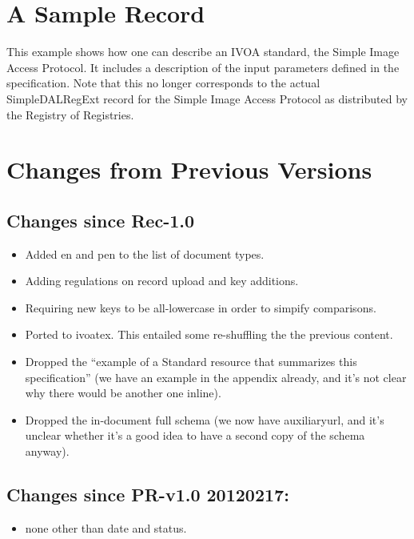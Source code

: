 \documentclass[11pt,a4paper]{ivoa}
\begin{document}
\appendix

\section{A Sample Record}
\label{app:fullrecord}

This example shows how one can describe an IVOA standard, the Simple
Image Access Protocol.  It includes a description of the input parameters
defined in the specification.  Note that this no longer corresponds to
the actual SimpleDALRegExt record for the Simple Image Access Protocol
as distributed by the Registry of Registries.



\section{Changes from Previous Versions}

\subsection{Changes since Rec-1.0}

\begin{itemize}
\item Added en and pen to the list of document types.
\item Adding regulations on record upload and key additions.
\item Requiring new keys to be all-lowercase in order to simpify
comparisons.
\item Ported to ivoatex.  This entailed some re-shuffling the the
previous content.
\item Dropped the ``example of a Standard resource that summarizes this
specification'' (we have an example in the appendix already, and it's
not clear why there would be another one inline).
\item Dropped the in-document full schema (we now have auxiliaryurl, and
it's unclear whether it's a good idea to have a second copy of the
schema anyway).
\end{itemize}

\subsection{Changes since PR-v1.0 20120217:}

\begin{itemize}
\item  none other than date and status.
\end{itemize}
\end{document}
